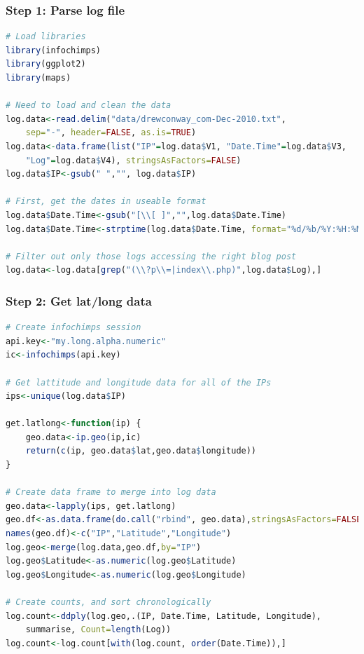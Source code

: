 \documentclass[xcolor=dvipsnames, 9pt]{beamer}
\begin{document}
\begin{frame}[fragile]
    \frametitle{Step 1: Parse log file}
    \scriptsize{\begin{lstlisting}[language=R]
# Load libraries
library(infochimps)
library(ggplot2)
library(maps)

# Need to load and clean the data
log.data<-read.delim("data/drewconway_com-Dec-2010.txt", 
    sep="-", header=FALSE, as.is=TRUE)
log.data<-data.frame(list("IP"=log.data$V1, "Date.Time"=log.data$V3, 
    "Log"=log.data$V4), stringsAsFactors=FALSE)
log.data$IP<-gsub(" ","", log.data$IP)

# First, get the dates in useable format
log.data$Date.Time<-gsub("[\\[ ]","",log.data$Date.Time)
log.data$Date.Time<-strptime(log.data$Date.Time, format="%d/%b/%Y:%H:%M:%S ")

# Filter out only those logs accessing the right blog post
log.data<-log.data[grep("(\\?p\\=|index\\.php)",log.data$Log),]
    \end{lstlisting}}
\end{frame}

\begin{frame}[fragile]
    \frametitle{Step 2: Get lat/long data}
    \scriptsize{\begin{lstlisting}[language=R]
# Create infochimps session
api.key<-"my.long.alpha.numeric"
ic<-infochimps(api.key)

# Get lattitude and longitude data for all of the IPs
ips<-unique(log.data$IP)

get.latlong<-function(ip) {
    geo.data<-ip.geo(ip,ic)
    return(c(ip, geo.data$lat,geo.data$longitude))
}

# Create data frame to merge into log data
geo.data<-lapply(ips, get.latlong)  
geo.df<-as.data.frame(do.call("rbind", geo.data),stringsAsFactors=FALSE)
names(geo.df)<-c("IP","Latitude","Longitude")
log.geo<-merge(log.data,geo.df,by="IP")
log.geo$Latitude<-as.numeric(log.geo$Latitude)
log.geo$Longitude<-as.numeric(log.geo$Longitude)

# Create counts, and sort chronologically
log.count<-ddply(log.geo,.(IP, Date.Time, Latitude, Longitude), 
    summarise, Count=length(Log))
log.count<-log.count[with(log.count, order(Date.Time)),]
    \end{lstlisting}}
\end{frame}
\end{document}
